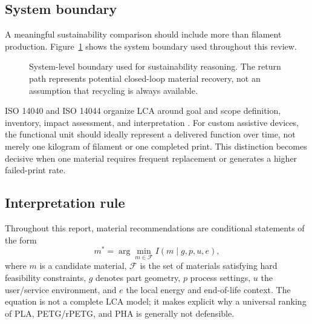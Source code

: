 \documentclass[11pt]{article}
\begin{document}
\subsection{System boundary}

A meaningful sustainability comparison should include more than filament production. Figure~\ref{fig:lifecycle} shows the system boundary used throughout this review.

\begin{figure}[htbp]
\centering
{}
\caption{System-level boundary used for sustainability reasoning. The return path represents potential closed-loop material recovery, not an assumption that recycling is always available.}
\label{fig:lifecycle}
\end{figure}

ISO 14040 and ISO 14044 organize LCA around goal and scope definition, inventory, impact assessment, and interpretation \cite{iso14040,iso14044}. For custom assistive devices, the functional unit should ideally represent a delivered function over time, not merely one kilogram of filament or one completed print. This distinction becomes decisive when one material requires frequent replacement or generates a higher failed-print rate.

\subsection{Interpretation rule}

Throughout this report, material recommendations are conditional statements of the form
\begin{equation}
  m^* = \arg\min_{m \in \mathcal{F}} I(m \mid g,p,u,e),
\end{equation}
where $m$ is a candidate material, $\mathcal{F}$ is the set of materials satisfying hard feasibility constraints, $g$ denotes part geometry, $p$ process settings, $u$ the user/service environment, and $e$ the local energy and end-of-life context. The equation is not a complete LCA model; it makes explicit why a universal ranking of PLA, PETG/rPETG, and PHA is generally not defensible.
\end{document}
